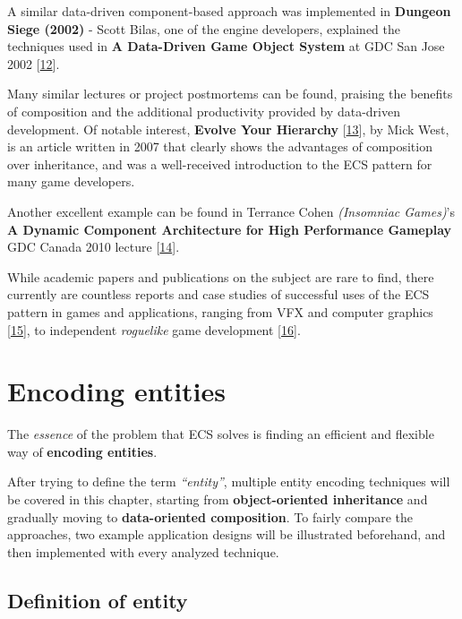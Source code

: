 \documentclass[oneside, 12pt, a4paper, openany]{book}
\begin{document}
A similar data-driven component-based approach was implemented in
\textbf{Dungeon Siege (2002)} - Scott Bilas, one of the engine
developers, explained the techniques used in \textbf{A Data-Driven Game
Object System} at GDC San Jose 2002
{[}\protect\hyperlink{ref-scottbilas_dungeonsiege_2002}{12}{]}.

Many similar lectures or project postmortems can be found, praising the
benefits of composition and the additional productivity provided by
data-driven development. Of notable interest, \textbf{Evolve Your
Hierarchy}
{[}\protect\hyperlink{ref-mickwest_evolveyourhierarchy_2007}{13}{]}, by
Mick West, is an article written in 2007 that clearly shows the
advantages of composition over inheritance, and was a well-received
introduction to the ECS pattern for many game developers.

Another excellent example can be found in Terrance Cohen
\emph{(Insomniac Games)}'s \textbf{A Dynamic Component Architecture for
High Performance Gameplay} GDC Canada 2010 lecture
{[}\protect\hyperlink{ref-terrancecohen_dynamiccomparchitecture_2010}{14}{]}.

While academic papers and publications on the subject are rare to find,
there currently are countless reports and case studies of successful
uses of the ECS pattern in games and applications, ranging from VFX and
computer graphics
{[}\protect\hyperlink{ref-stackexchange_ixe_answer}{15}{]}, to
independent \emph{roguelike} game development
{[}\protect\hyperlink{ref-sproggiwood_irdc_2015_talk}{16}{]}.

\hypertarget{chapter_encoding_entities}{\chapter{Encoding
entities}\label{chapter_encoding_entities}}

The \emph{essence} of the problem that ECS solves is finding an
efficient and flexible way of \textbf{encoding entities}.

After trying to define the term \emph{``entity''}, multiple entity
encoding techniques will be covered in this chapter, starting from
\textbf{object-oriented inheritance} and gradually moving to
\textbf{data-oriented composition}. To fairly compare the approaches,
two example application designs will be illustrated beforehand, and then
implemented with every analyzed technique.

\section{Definition of entity}\label{definition-of-entity}
\end{document}
